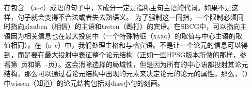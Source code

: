 \zl
在包含 （a--c）成语的句子中，X成分一定是指称主句主语的代词。如果不是这样，句子就会变得不合法或者失去熟语义。
\eal
{}
\zl
为了强制这一同指，一个限制必须同时指向glauben（相信）的主语和treten（踢打）的宾语。在SBCG中，可以指向主语因为相关信息也在最大投射中（一个特殊特征（\textsc{xarg}）的取值与中心主语的取值相同）。在（a--c）中，我们处理主格和与格宾语。不是让一个论元的信息可以得到，而是要在最大投射中表征整个论元结构（正如一些HPSG版本所做的那样，参看第~\pageref{Seite-Bender-Wambaya}页和第~\pageref{page-Bender-Wambaya-two}--\pageref{page-non-cancellation-end}页）。这会消除选择的局域性，但是因为所有的中心语都投射其论元结构，那么可以通过看论元结构中出现的元素来决定论元的论元的属性。那么，（）中wissen（知道）的论元结构包括对dass小句的刻画。

